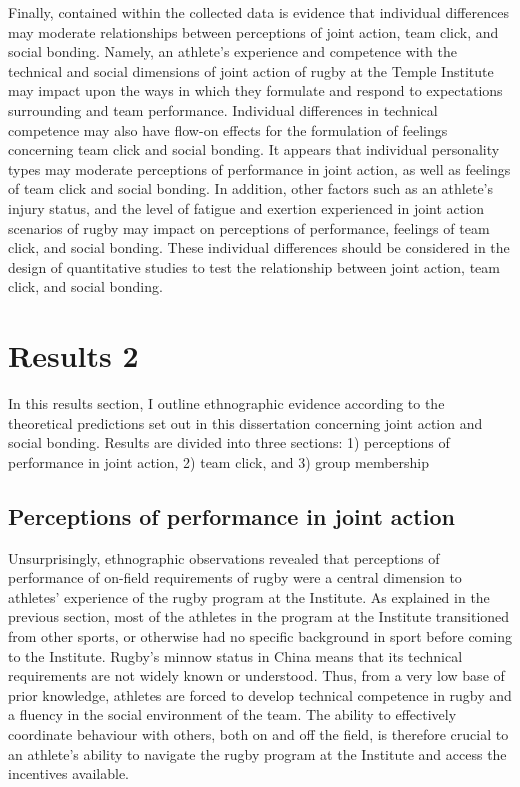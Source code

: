 \begin{CJK}{UTF8}{gbsn}
Finally, contained within the collected data is evidence that individual differences may moderate relationships between perceptions of joint action, team click, and social bonding.  Namely, an athlete's experience and competence with the technical and social dimensions of joint action of rugby at the Temple Institute may impact upon the ways in which they formulate and respond to expectations surrounding and team performance.  Individual differences in technical competence may also have flow-on effects for the formulation of feelings concerning team click and social bonding. It appears that individual personality types may moderate perceptions of performance in joint action, as well as feelings of team click and social bonding. In addition, other factors such as an athlete's injury status, and the level of fatigue and exertion experienced in joint action scenarios of rugby may impact on perceptions of performance, feelings of team click, and social bonding.  These individual differences should be considered in the design of quantitative studies to test the relationship between joint action, team click, and social bonding.








\section{Results 2}



In this results section, I outline ethnographic evidence according to the theoretical predictions set out in this dissertation concerning joint action and social bonding. Results are divided into three sections: 1) perceptions of performance in joint action, 2) team click, and 3) group membership




\subsection{Perceptions of performance in joint action}
Unsurprisingly, ethnographic observations revealed that perceptions of performance of on-field requirements of rugby were a central dimension to athletes' experience of the rugby program at the Institute.  As explained in the previous section, most of the athletes in the program at the Institute transitioned from other sports, or otherwise had no specific background in sport before coming to the Institute.  Rugby's minnow status in China means that its technical requirements are not widely known or understood.  Thus, from a very low base of prior knowledge, athletes are forced to develop technical competence in rugby and a fluency in the social environment of the team.  The ability to effectively coordinate behaviour with others, both on and off the field, is therefore crucial to an athlete's ability to navigate the rugby program at the Institute and access the incentives available.


\end{CJK}
